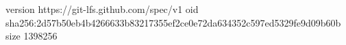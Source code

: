 version https://git-lfs.github.com/spec/v1
oid sha256:2d57b50eb4b4266633b83217355ef2ce0e72da634352c597ed5329fe9d09b60b
size 1398256
